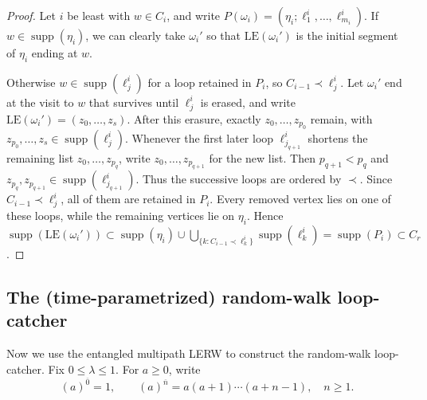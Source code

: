 \documentclass[11pt]{article}
\numberwithin{equation}{section}
\newcommand{\1}{\mathbf{1}}
\newcommand{\LE}{\mathrm{LE}}
\newcommand{\supp}{\operatorname{supp}}
\begin{document}
\begin{proof}
Let \(i\) be least with \(w\in C_i\), and write
\(P(\omega_i)=(\eta_i;\ell_1^i,\ldots,\ell_{m_i}^i)\).
If \(w\in\supp(\eta_i)\), we can clearly take \(\omega_i'\) so that
\(\LE(\omega_i')\) is the initial segment of \(\eta_i\) ending at \(w\).

Otherwise \(w\in\supp(\ell_j^i)\) for a loop retained in \(P_i\), so
\(C_{i-1}\prec\ell_j^i\).  Let
\(\omega_i'\) end at the visit to \(w\) that survives until \(\ell_j^i\)
is erased, and write
\(\LE(\omega_i')=(z_0,\ldots,z_s)\).  After this erasure, exactly
\(z_0,\ldots,z_{p_0}\) remain, with
\(z_{p_0},\ldots,z_s\in\supp(\ell_j^i)\).
Whenever the first later loop \(\ell_{j_{q+1}}^i\) shortens the remaining
list \(z_0,\ldots,z_{p_q}\), write \(z_0,\ldots,z_{p_{q+1}}\) for the new
list.  Then \(p_{q+1}<p_q\) and
\(z_{p_q},z_{p_{q+1}}\in\supp(\ell_{j_{q+1}}^i)\).  Thus the successive
loops are ordered by \(\prec\).  Since \(C_{i-1}\prec\ell_j^i\), all of
them are retained in \(P_i\).  Every removed vertex lies on one of these
loops, while the remaining vertices lie on \(\eta_i\).  Hence
$ \supp\!\left(\LE(\omega_i')\right)
 \subset\supp(\eta_i)\cup
 \bigcup_{\{k:C_{i-1}\prec\ell_k^i\}}\supp(\ell_k^i)
 =\supp(P_i)\subset C_r$.
\end{proof}

\subsection{The (time-parametrized) random-walk loop-catcher}
\label{subsec:finite-construction}

Now we use the entangled multipath LERW to construct the random-walk loop-catcher.
Fix $0\le\lambda\le 1$.  
For $a\ge0$, write
\[
 (a)^{\overline0}=1,\qquad
 (a)^{\overline n}=a(a+1)\cdots(a+n-1),\quad n\ge1.
\]
\end{document}
